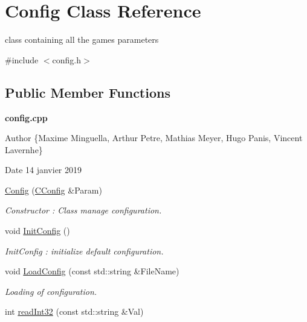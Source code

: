 \hypertarget{class_config}{}\section{Config Class Reference}
\label{class_config}


class containing all the game\textquotesingle{}s parameters  




{\ttfamily \#include $<$config.\+h$>$}

\subsection*{Public Member Functions}
\begin{Indent}\textbf{ config.\+cpp}\par
{\em \begin{DoxyAuthor}{Author}
\{Maxime Minguella, Arthur Petre, Mathias Meyer, Hugo Panis, Vincent Lavernhe\}
\end{DoxyAuthor}
\begin{DoxyDate}{Date}
14 janvier 2019 
\end{DoxyDate}
}\begin{DoxyCompactItemize}
\item 
\hyperlink{class_config_a16c54796accfc2d9ffe6ded6f8b9dde2}{Config} (\hyperlink{struct_c_config}{C\+Config} \&Param)
\begin{DoxyCompactList}\small\item\em Constructor \+: Class manage configuration. \end{DoxyCompactList}\item 
\mbox{\label{class_config_a610f42bcbd3b590b961fa6de5ba5b968}} 
void \hyperlink{class_config_a610f42bcbd3b590b961fa6de5ba5b968}{Init\+Config} ()
\begin{DoxyCompactList}\small\item\em Init\+Config \+: initialize default configuration. \end{DoxyCompactList}\item 
void \hyperlink{class_config_aece9ad7b2f011e211ae9c82a7ae506bc}{Load\+Config} (const std\+::string \&File\+Name)
\begin{DoxyCompactList}\small\item\em Loading of configuration. \end{DoxyCompactList}\item 
int \hyperlink{class_config_aaf4d21cf2d2c0c2ca7666c2c360f70b6}{read\+Int32} (const std\+::string \&Val)

\end{DoxyCompactItemize}
\end{Indent}
